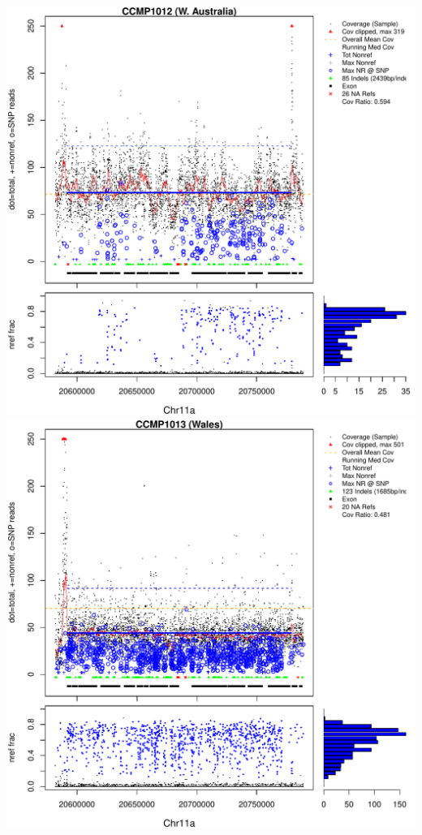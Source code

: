 \documentclass{article}\usepackage[]{graphicx}\usepackage[]{color}
\makeatletter
\def\maxwidth{ %
  \ifdim\Gin@nat@width>\linewidth
    \linewidth
  \else
    \Gin@nat@width
  \fi
}
\newenvironment{knitrout}{}{} %
\makeatother
\begin{document}
\begin{knitrout}
{\includegraphics[width=\maxwidth]{figs-knitr/unnamed-chunk-50-3} 
\includegraphics[width=\maxwidth]{figs-knitr/unnamed-chunk-50-4} 
}
\end{knitrout}
\end{document}
